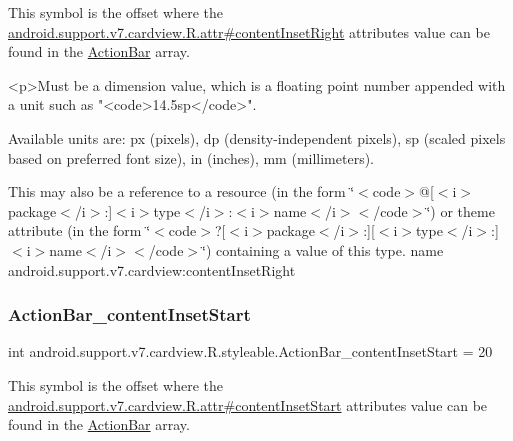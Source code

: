 This symbol is the offset where the \hyperlink{classandroid_1_1support_1_1v7_1_1cardview_1_1R_1_1attr_a521bca396b0fb2722f7dda4656f2d45c}{android.\+support.\+v7.\+cardview.\+R.\+attr\#content\+Inset\+Right} attribute\textquotesingle{}s value can be found in the \hyperlink{classandroid_1_1support_1_1v7_1_1cardview_1_1R_1_1styleable_a0cbf7f776e31f78bb0a2b558daf176f8}{Action\+Bar} array.

\begin{DoxyVerb}      <p>Must be a dimension value, which is a floating point number appended with a unit such as "<code>14.5sp</code>".
\end{DoxyVerb}
 Available units are\+: px (pixels), dp (density-\/independent pixels), sp (scaled pixels based on preferred font size), in (inches), mm (millimeters). 

This may also be a reference to a resource (in the form \char`\"{}$<$code$>$@\mbox{[}$<$i$>$package$<$/i$>$\+:\mbox{]}$<$i$>$type$<$/i$>$\+:$<$i$>$name$<$/i$>$$<$/code$>$\char`\"{}) or theme attribute (in the form \char`\"{}$<$code$>$?\mbox{[}$<$i$>$package$<$/i$>$\+:\mbox{]}\mbox{[}$<$i$>$type$<$/i$>$\+:\mbox{]}$<$i$>$name$<$/i$>$$<$/code$>$\char`\"{}) containing a value of this type.  name android.\+support.\+v7.\+cardview\+:content\+Inset\+Right \mbox{\label{classandroid_1_1support_1_1v7_1_1cardview_1_1R_1_1styleable_a7e19145090b9eaa2625e1b3640a6d252}} 
\subsubsection{\texorpdfstring{Action\+Bar\+\_\+content\+Inset\+Start}{ActionBar\_contentInsetStart}}
{\footnotesize\ttfamily int android.\+support.\+v7.\+cardview.\+R.\+styleable.\+Action\+Bar\+\_\+content\+Inset\+Start = 20\hspace{0.3cm}{\ttfamily [static]}}

This symbol is the offset where the \hyperlink{classandroid_1_1support_1_1v7_1_1cardview_1_1R_1_1attr_a0fa2d8301062ba60e97d1f8229caa0e1}{android.\+support.\+v7.\+cardview.\+R.\+attr\#content\+Inset\+Start} attribute\textquotesingle{}s value can be found in the \hyperlink{classandroid_1_1support_1_1v7_1_1cardview_1_1R_1_1styleable_a0cbf7f776e31f78bb0a2b558daf176f8}{Action\+Bar} array.

